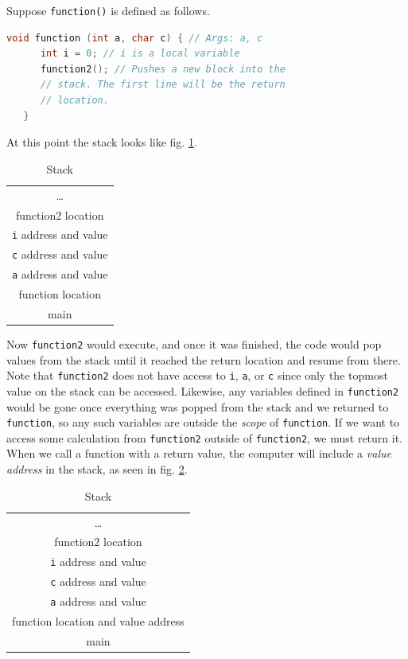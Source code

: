 \documentclass[nobib]{tufte-handout}
\begin{document}
Suppose \texttt{function()} is defined as follows.  
\begin{lstlisting}[language=C,caption=Functions in memory]
   void function (int a, char c) { // Args: a, c
      int i = 0; // i is a local variable
      function2(); // Pushes a new block into the
      // stack. The first line will be the return 
      // location.
   }
\end{lstlisting}
At this point the stack looks like fig. \ref{table:stackexample}.
\begin{table}[h]
   \centering
   \caption{Stack}
   \label{table:stackexample}
   \begin{tabular}{|c|}
   \hline
   \dots \\
   function2 location\\
   \hline
   \texttt{i} address and value \\
   \texttt{c} address and value \\
   \texttt{a} address and value \\
   function location\\
   \hline
   main \\
   \hline
   \end{tabular}
\end{table}
Now \texttt{function2} would execute, and once it was finished, the code would pop
values from the stack until it reached 
the return location and resume from there. Note that \texttt{function2}
does not have access to \texttt{i}, \texttt{a}, or \texttt{c} since only the 
topmost value on the stack can be accessed. Likewise, any variables defined in 
\texttt{function2} would be gone once everything was popped from the stack
and we returned to \texttt{function}, so any such variables are 
outside the \emph{scope} of \texttt{function}. If we want to access some calculation
from \texttt{function2} outside of \texttt{function2}, we must return it. When
we call a function with a return value, the computer will include a \emph{value address}
in the stack, as seen in fig. \ref{table:stackvalueaddress}. 
\begin{table}[h]
   \centering
   \caption{Stack}
   \label{table:stackvalueaddress}
   \begin{tabular}{|c|}
   \hline
   \dots \\
   function2 location\\
   \hline
   \texttt{i} address and value \\
   \texttt{c} address and value \\
   \texttt{a} address and value \\
   function location and value address\\
   \hline
   main \\
   \hline
   \end{tabular}
\end{table}
\end{document}
